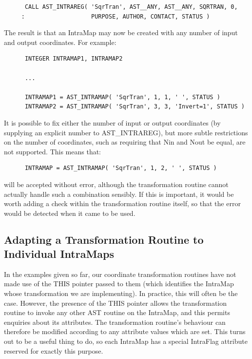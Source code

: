 \documentclass[twoside,11pt]{article}
\newcommand{\htmlref}[2]{#1}
\begin{document}
\small
\begin{verbatim}
      CALL AST_INTRAREG( 'SqrTran', AST__ANY, AST__ANY, SQRTRAN, 0,
     :                   PURPOSE, AUTHOR, CONTACT, STATUS )
\end{verbatim}
\normalsize

The result is that an \htmlref{IntraMap}{IntraMap} may now be created with any number of
input and output coordinates. For example:

\small
\begin{verbatim}
      INTEGER INTRAMAP1, INTRAMAP2

      ...

      INTRAMAP1 = AST_INTRAMAP( 'SqrTran', 1, 1, ' ', STATUS )
      INTRAMAP2 = AST_INTRAMAP( 'SqrTran', 3, 3, 'Invert=1', STATUS )
\end{verbatim}
\normalsize

It is possible to fix either the number of input or output coordinates
(by supplying an explicit number to \htmlref{AST\_INTRAREG}{AST_INTRAREG}), but more subtle
restrictions on the number of coordinates, such as requiring that \htmlref{Nin}{Nin}
and \htmlref{Nout}{Nout} be equal, are not supported. This means that:

\small
\begin{verbatim}
      INTRAMAP = AST_INTRAMAP( 'SqrTran', 1, 2, ' ', STATUS )
\end{verbatim}
\normalsize

will be accepted without error, although the transformation routine
cannot actually handle such a combination sensibly. If this is
important, it would be worth adding a check within the transformation
routine itself, so that the error would be detected when it came to be
used.

\subsection{\label{ss:intraflag}Adapting a Transformation Routine to Individual IntraMaps}

In the examples given so far, our coordinate transformation routines
have not made use of the THIS pointer passed to them (which identifies
the \htmlref{IntraMap}{IntraMap} whose transformation we are implementing). In practice,
this will often be the case. However, the presence of the THIS pointer
allows the transformation routine to invoke any other AST routine on
the IntraMap, and this permits enquiries about its attributes. The
transformation routine's behaviour can therefore be modified according
to any attribute values which are set. This turns out to be a useful
thing to do, so each IntraMap has a special \htmlref{IntraFlag}{IntraFlag} attribute reserved
for exactly this purpose.
\end{document}
